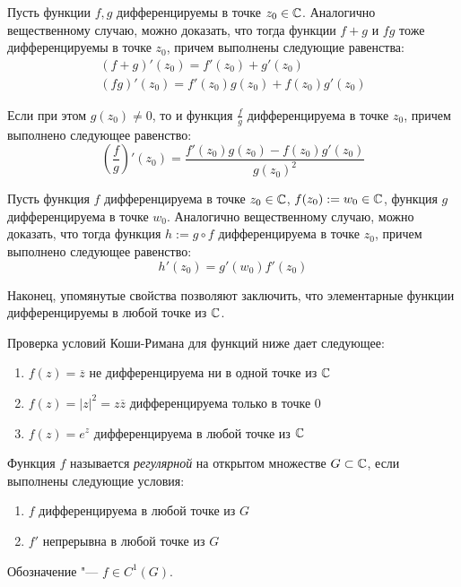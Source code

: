 \begin{note}
	Пусть функции $f, g$ дифференцируемы в точке $z_0 \in \mathbb{C}$. Аналогично вещественному случаю, можно доказать, что тогда функции $f + g$ и $fg$ тоже дифференцируемы в точке $z_0$, причем выполнены следующие равенства:
	\begin{gather*}
		(f + g)'(z_0) = f'(z_0) + g'(z_0)\\
		(fg)'(z_0) = f'(z_0)g(z_0) + f(z_0)g'(z_0)
	\end{gather*}
	
	Если при этом $g(z_0) \ne 0$, то и функция $\frac fg$ дифференцируема в точке $z_0$, причем выполнено следующее равенство:
	\[
	\left(\frac fg\right)'(z_0) = \frac{f'(z_0)g(z_0) - f(z_0)g'(z_0)}{g(z_0)^2}\]
\end{note}

\begin{note}
	Пусть функция $f$ дифференцируема в точке $z_0 \in \mathbb{C}$, $f(z_0) := w_0 \in \mathbb{C}$, функция $g$ дифференцируема в точке $w_0$. Аналогично вещественному случаю, можно доказать, что тогда функция $h := g \circ f$ дифференцируема в точке $z_0$, причем выполнено следующее равенство:
	\[h'(z_0) = g'(w_0)f'(z_0)\]
	
	Наконец, упомянутые свойства позволяют заключить, что элементарные функции дифференцируемы в любой точке из $\mathbb{C}$.
\end{note}

\begin{unnecessary}
    \begin{example}
    	Проверка условий Коши-Римана для функций ниже дает следующее:
    	\begin{enumerate}
    		\item $f(z) =\overline{z}$ не дифференцируема ни в одной точке из $\mathbb{C}$
    		\item $f(z) = |z|^2 = z\overline{z}$ дифференцируема только в точке $0$
    		\item $f(z) = e^z$ дифференцируема в любой точке из $\mathbb{C}$
    	\end{enumerate}
    \end{example}
\end{unnecessary}

\begin{definition}
	Функция $f$ называется \textit{регулярной} на открытом множестве $G \subset \mathbb{C}$, если выполнены следующие условия:
	\begin{enumerate}
		\item $f$ дифференцируема в любой точке из $G$
		\item $f'$ непрерывна в любой точке из $G$
	\end{enumerate}

	Обозначение "--- $f \in C^1(G)$.
\end{definition}

